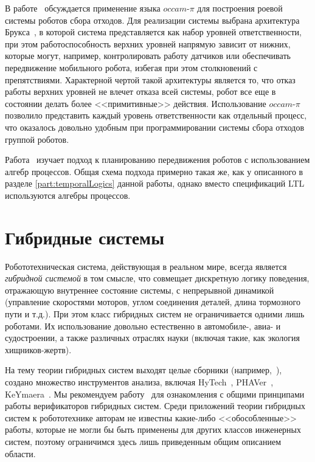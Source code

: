 \documentclass[conference]{IEEEtran}
\begin{document}
В работе~\cite{posso2011process} обсуждается применение языка $occam\mbox{-}\pi$ для 
построения роевой~\cite{csahin2005swarm} системы роботов сбора отходов. 
Для реализации системы выбрана архитектура Брукса~\cite{brooks1986layered}, в 
которой система представляется как набор уровней ответственности, при этом 
работоспособность верхних уровней напрямую зависит от нижних, которые могут, 
например, контролировать работу датчиков или обеспечивать передвижение 
мобильного робота, избегая при этом столкновений с препятствиями. Характерной 
чертой такой архитектуры является то, что отказ работы верхних уровней не влечет 
отказа всей системы, робот все еще в состоянии делать более <<примитивные>> 
действия. Использование $occam\mbox{-}\pi$ позволило представить каждый уровень 
ответственности как отдельный процесс, что оказалось довольно удобным при 
программировании системы сбора отходов группой роботов.

Работа~\cite{varricchio2014sampling} изучает подход к планированию передвижения 
роботов с использованием алгебр процессов. Общая схема подхода примерно такая 
же, как у описанного в разделе \ref{part:temporalLogics} данной работы, однако 
вместо спецификаций LTL используются алгебры процессов.

\section{Гибридные системы}
Робототехническая система, действующая в реальном мире, всегда является 
\textit{гибридной системой} в том смысле, что совмещает дискретную логику поведения, 
отражающую внутреннее состояние системы, с непрерывной динамикой (управление 
скоростями моторов, углом соединения деталей, длина тормозного пути и т.д.). 
При этом класс гибридных систем не ограничивается одними лишь роботами. Их 
использование довольно естественно в автомобиле-, авиа- и судостроении, а также 
различных отраслях науки (включая такие, как экология хищников-жертв).

На тему теории гибридных систем выходят целые сборники 
(например,~\cite{vaandrager1999hybrid, lynch2007hybrid}), 
создано множество инструментов анализа, включая HyTech~\cite{henzinger1997hytech}, 
PHAVer~\cite{frehse2005phaver}, KeYmaera~\cite{platzer2008keymaera}. 
Мы рекомендуем работу~\cite{alur1995algorithmic} для ознакомления с общими 
принципами работы верификаторов гибридных систем. Среди приложений теории 
гибридных систем к робототехнике авторам не известны какие-либо <<обособленные>> 
работы, которые не могли бы быть применены для других классов инженерных систем, 
поэтому ограничимся здесь лишь приведенным общим описанием области.
\end{document}
